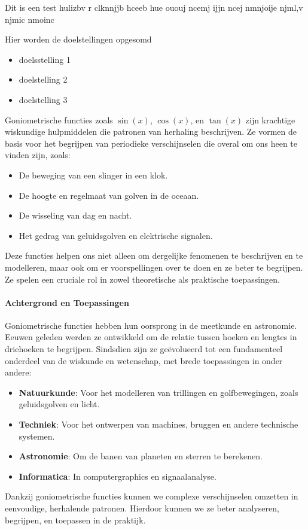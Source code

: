 \documentclass{ximera}
\begin{document}
\begin{template1}
   Dit is een test hulizbv r clknnjjb hceeb hue ououj ncemj ijjn ncej nmnjoije njml,v njmic nmoinc 
\end{template1}
    



\begin{template}
Hier worden de doelstellingen opgesomd
\begin{itemize}
    \item doelsstelling 1
    \item doelstelling 2
    \item doelstelling 3
\end{itemize}
\end{template}


Goniometrische functies zoals \(\sin(x)\), \(\cos(x)\), en \(\tan(x)\) zijn krachtige wiskundige hulpmiddelen die patronen van herhaling beschrijven. Ze vormen de basis voor het begrijpen van periodieke verschijnselen die overal om ons heen te vinden zijn, zoals:
\begin{itemize}
    \item De beweging van een slinger in een klok.
    \item De hoogte en regelmaat van golven in de oceaan.
    \item De wisseling van dag en nacht.
    \item Het gedrag van geluidsgolven en elektrische signalen.
\end{itemize}
Deze functies helpen ons niet alleen om dergelijke fenomenen te beschrijven en te modelleren, maar ook om er voorspellingen over te doen en ze beter te begrijpen. Ze spelen een cruciale rol in zowel theoretische als praktische toepassingen.

\paragraph*{Achtergrond en Toepassingen} 
Goniometrische functies hebben hun oorsprong in de meetkunde en astronomie. Eeuwen geleden werden ze ontwikkeld om de relatie tussen hoeken en lengtes in driehoeken te begrijpen. Sindsdien zijn ze geëvolueerd tot een fundamenteel onderdeel van de wiskunde en wetenschap, met brede toepassingen in onder andere:

\begin{itemize}
    \item \textbf{Natuurkunde}: Voor het modelleren van trillingen en golfbewegingen, zoals geluidsgolven en licht.
    \item \textbf{Techniek}: Voor het ontwerpen van machines, bruggen en andere technische systemen.
    \item \textbf{Astronomie}: Om de banen van planeten en sterren te berekenen.
    \item \textbf{Informatica}: In computergraphics en signaalanalyse.
\end{itemize}

Dankzij goniometrische functies kunnen we complexe verschijnselen omzetten in eenvoudige, herhalende patronen. Hierdoor kunnen we ze beter analyseren, begrijpen, en toepassen in de praktijk.
\end{document}
